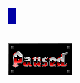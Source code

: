\begin{minipage}{.1\textwidth}
     \includegraphics[width=\textwidth]{imgs/latched/98.png}
  \end{minipage}
  \begin{minipage}{.3\textwidth}
     \includegraphics[width=\textwidth]{imgs/latched/133.png}
  \end{minipage}
